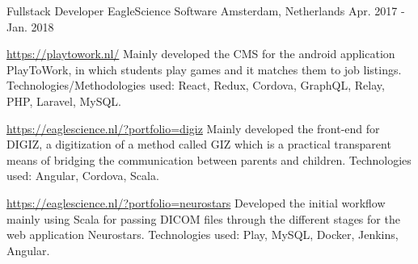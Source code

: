 \begin{cventries}
\cventry
{Fullstack Developer} %
{EagleScience Software} %
{Amsterdam, Netherlands} %
{Apr. 2017 - Jan. 2018} %
{
	\begin{cvitems} %
		\item {\url{https://playtowork.nl/}}
			\newline
			Mainly developed the CMS for the android application PlayToWork, in which students play games and it matches them to job listings.
			\newline
			Technologies/Methodologies used: React, Redux, Cordova, GraphQL, Relay, PHP, Laravel, MySQL.  
		\item {\url{https://eaglescience.nl/?portfolio=digiz} 
			\newline
			Mainly developed the front-end for DIGIZ, a digitization of a method called GIZ which is a practical transparent means of bridging the communication between parents and children.
			\newline
			Technologies used: Angular, Cordova, Scala. }
		\item {\url{https://eaglescience.nl/?portfolio=neurostars}
			\newline
			Developed the initial workflow mainly using Scala for passing DICOM files through the different stages for the web application Neurostars.
			\newline
			Technologies used: Play, MySQL, Docker, Jenkins, Angular.}
	\end{cvitems}
}
\end{cventries}
